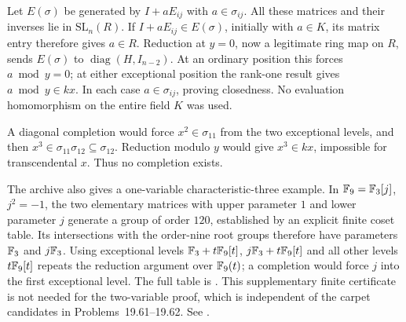 Let \(E(\sigma)\) be generated by \(I+aE_{ij}\) with
\(a\in\sigma_{ij}\).
All these matrices and their inverses lie in \(\mathrm{SL}_n(R)\).
If \(I+aE_{ij}\in E(\sigma)\), initially with \(a\in K\), its
matrix entry therefore gives \(a\in R\).
Reduction at \(y=0\), now a legitimate ring map on \(R\), sends
\(E(\sigma)\) to \(\operatorname{diag}(H,I_{n-2})\).
At an ordinary position this forces \(a\bmod y=0\); at either
exceptional position the rank-one result gives \(a\bmod y\in kx\).
In each case \(a\in\sigma_{ij}\), proving closedness.
No evaluation homomorphism on the entire field \(K\) was used.

A diagonal completion would force
\(x^2\in\sigma_{11}\) from the two exceptional levels, and then
\(x^3\in\sigma_{11}\sigma_{12}\subseteq\sigma_{12}\).
Reduction modulo \(y\) would give \(x^3\in kx\), impossible for
transcendental \(x\).
Thus no completion exists.

The archive also gives a one-variable characteristic-three example.
In \(\mathbb F_9=\mathbb F_3[j]\), \(j^2=-1\), the two elementary matrices with
upper parameter \(1\) and lower parameter \(j\) generate a group
of order \(120\), established by an explicit finite coset table.
Its intersections with the order-nine root groups therefore have
parameters \(\mathbb F_3\) and \(j\mathbb F_3\).
Using exceptional levels
\(\mathbb F_3+t\mathbb F_9[t]\), \(j\mathbb F_3+t\mathbb F_9[t]\) and all other levels
\(t\mathbb F_9[t]\) repeats the reduction argument over \(\mathbb F_9(t)\);
a completion would force \(j\) into the first exceptional level.
The full table is .
This supplementary finite certificate is not needed for the
two-variable proof, which is independent of the carpet candidates
in Problems~19.61--19.62.
See .
